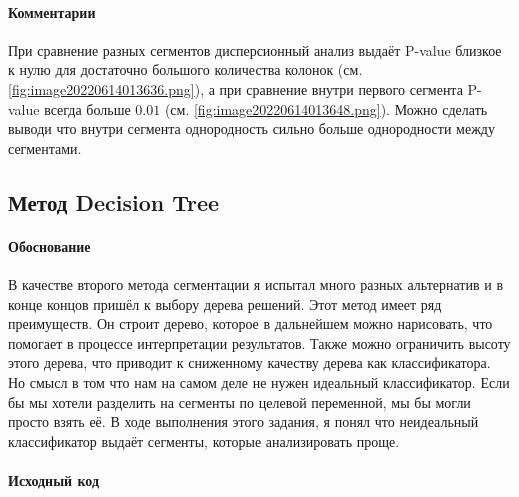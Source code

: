 \documentclass[12pt,a4paper]{article}
\begin{document}
  \paragraph*{Комментарии}
  При сравнение разных сегментов дисперсионный анализ выдаёт P-value близкое к нулю для достаточно большого количества колонок
  (см. \autoref{fig:image20220614013636.png}),
  а при сравнение внутри первого сегмента P-value всегда больше $0.01$ (см. \autoref{fig:image20220614013648.png}).
  Можно сделать выводи что внутри сегмента однородность сильно больше однородности между сегментами.

  \subsection{Метод Decision Tree}
  \paragraph*{Обоснование}
  В качестве второго метода сегментации я испытал много разных альтернатив и в конце концов пришёл к выбору дерева решений.
  Этот метод имеет ряд преимуществ. Он строит дерево, которое в дальнейшем можно нарисовать, что помогает в процессе интерпретации результатов. Также можно ограничить высоту этого дерева, что приводит к сниженному качеству дерева как классификатора.
  Но смысл в том что нам на самом деле не нужен идеальный классификатор.
  Если бы мы хотели разделить на сегменты по целевой переменной, мы бы могли просто взять её.
  В ходе выполнения этого задания, я понял что неидеальный классификатор выдаёт сегменты, которые анализировать проще.

  \paragraph*{Исходный код}
\begin{Shaded}
\begin{Highlighting}[]

\OperatorTok{=}\OperatorTok{=}\OperatorTok{=}\NormalTok{)}
\OperatorTok{=}\NormalTok{(}\NormalTok{, }\OperatorTok{=}\NormalTok{)}
\OperatorTok{=}\NormalTok{  OrdinalEncoder().fit\_transform(data[[}\NormalTok{]])}
\end{Highlighting}
\end{Shaded}
\end{document}
